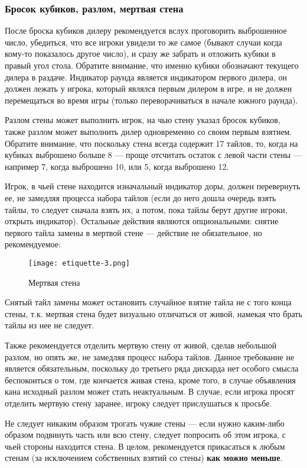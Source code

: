 \subsubsection{Бросок кубиков, разлом, мертвая стена}

После броска кубиков дилеру рекомендуется вслух проговорить выброшенное число, убедиться, что все игроки увидели то же самое (бывают случаи когда кому-то показалось другое число), и сразу же забрать и отложить кубики в правый угол стола. Обратите внимание, что именно кубики обозначают текущего дилера в раздаче. Индикатор раунда является индикатором первого дилера, он должен лежать у игрока, который являлся первым дилером в игре, и не должен перемещаться во время игры (только переворачиваться в начале южного раунда). 

Разлом стены может выполнить игрок, на чью стену указал бросок кубиков, также разлом может выполнить дилер одновременно со своим первым взятием. Обратите внимание, что поскольку стена всегда содержит 17 тайлов, то, когда на кубиках выброшено больше 8 --- проще отсчитать остаток с левой части стены --- например 7, когда выброшено 10, или 5, когда выброшено 12.

Игрок, в чьей стене находится изначальный индикатор доры, должен перевернуть ее, не замедляя процесса набора тайлов (если до него дошла очередь взять тайлы, то следует сначала взять их, а потом, пока тайлы берут другие игроки, открыть индикатор). Остальные действия являются опциональными: снятие первого тайла замены в мертвой стене --- действие не обязательное, но рекомендуемое:

\begin{figure}[H]
	\centering
	\texttt{[image: etiquette-3.png]}
	\caption{Мертвая стена}
\end{figure}

Снятый тайл замены может остановить случайное взятие тайла не с того конца стены, т.к. мертвая стена будет визуально отличаться от живой, намекая что брать тайлы из нее не следует. 

Также рекомендуется отделить мертвую стену от живой, сделав небольшой разлом, но опять же, не замедляя процесс набора тайлов. Данное требование не является обязательным, поскольку до третьего ряда дискарда нет особого смысла беспокоиться о том, где кончается живая стена, кроме того, в случае объявления кана исходный разлом может стать неактуальным. В случае, если игрока просят отделить мертвую стену заранее, игроку следует прислушаться к просьбе.

Не следует никаким образом трогать чужие стены --- если нужно каким-либо образом подвинуть часть или всю стену, следует попросить об этом игрока, с чьей стороны находится стена. В целом, рекомендуется прикасаться к любым стенам (за исключением собственных взятий со стены) \textbf{как можно меньше}.

